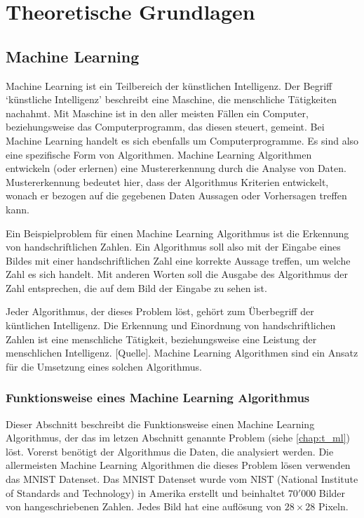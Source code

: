 \chapter{Theoretische Grundlagen}
\section{Machine Learning}
\label{chap:t_ml}
Machine Learning ist ein Teilbereich der künstlichen Intelligenz. Der Begriff
`künstliche Intelligenz' beschreibt eine Maschine, die menschliche Tätigkeiten
nachahmt. Mit Maschine ist in den aller meisten Fällen ein Computer,
beziehungsweise das Computerprogramm, das diesen steuert, gemeint. Bei Machine
Learning handelt es sich ebenfalls um Computerprogramme. Es sind also eine
spezifische Form von Algorithmen. Machine Learning Algorithmen entwickeln (oder
erlernen) eine Mustererkennung durch die Analyse von Daten. Mustererkennung
bedeutet hier, dass der Algorithmus Kriterien entwickelt, wonach er bezogen auf
die gegebenen Daten Aussagen oder Vorhersagen treffen kann.

Ein Beispielproblem für einen Machine Learning Algorithmus ist die Erkennung von
handschriftlichen Zahlen. Ein Algorithmus soll also mit der Eingabe eines Bildes
mit einer handschriftlichen Zahl eine korrekte Aussage treffen, um welche Zahl
es sich handelt. Mit anderen Worten soll die Ausgabe des Algorithmus der Zahl
entsprechen, die auf dem Bild der Eingabe zu sehen ist.

Jeder Algorithmus, der dieses Problem löst, gehört zum Überbegriff der
küntlichen Intelligenz. Die Erkennung und Einordnung von handschriftlichen
Zahlen ist eine menschliche Tätigkeit, beziehungsweise eine Leistung der
menschlichen Intelligenz. [Quelle]. Machine Learning Algorithmen sind ein Ansatz
für die Umsetzung eines solchen Algorithmus.

\subsection*{Funktionsweise eines Machine Learning Algorithmus}
Dieser Abschnitt beschreibt die Funktionsweise einen Machine Learning
Algorithmus, der das im letzen Abschnitt genannte Problem (siehe
\autoref{chap:t_ml}) löst. Vorerst benötigt der Algorithmus die Daten, die
analysiert werden. Die allermeisten Machine Learning Algorithmen die dieses
Problem lösen verwenden das MNIST Datenset. Das MNIST Datenset wurde vom NIST
(National Institute of Standards and Technology) in Amerika erstellt und
beinhaltet $70'000$ Bilder von hangeschriebenen Zahlen. Jedes Bild hat eine
auflösung von $28\times28$ Pixeln.

